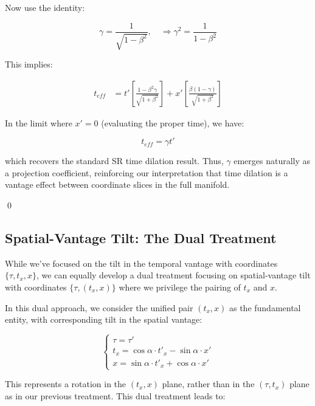 \documentclass{article}
\begin{document}
Now use the identity:

\begin{equation}
\gamma = \frac{1}{\sqrt{1 - \beta^2}}, \quad \Rightarrow \gamma^2 = \frac{1}{1 - \beta^2}
\end{equation}

This implies:

\begin{align*}
t_{eff} &= t'\left[\frac{1 - \beta^2\gamma}{\sqrt{1 + \beta^2}}\right] + x'\left[\frac{\beta(1 - \gamma)}{\sqrt{1 + \beta^2}}\right]
\end{align*}

In the limit where $x' = 0$ (evaluating the proper time), we have:

\begin{equation}
t_{eff} = \gamma t'
\end{equation}

which recovers the standard SR time dilation result. Thus, $\gamma$ emerges naturally as a projection coefficient, reinforcing our interpretation that time dilation is a vantage effect between coordinate slices in the full manifold.

\qed




\subsection{Spatial-Vantage Tilt: The Dual Treatment}

While we've focused on the tilt in the temporal vantage with coordinates $\{\tau, t_x, x\}$, we can equally develop a dual treatment focusing on spatial-vantage tilt with coordinates $\{\tau, (t_x, x)\}$ where we privilege the pairing of $t_x$ and $x$.

In this dual approach, we consider the unified pair $(t_x, x)$ as the fundamental entity, with corresponding tilt in the spatial vantage:

\begin{equation}
\begin{cases}
\tau = \tau' \\
t_x = \cos\alpha \cdot t'_x - \sin\alpha \cdot x' \\
x = \sin\alpha \cdot t'_x + \cos\alpha \cdot x'
\end{cases}
\end{equation}

This represents a rotation in the $(t_x, x)$ plane, rather than in the $(\tau, t_x)$ plane as in our previous treatment. This dual treatment leads to:
\end{document}
